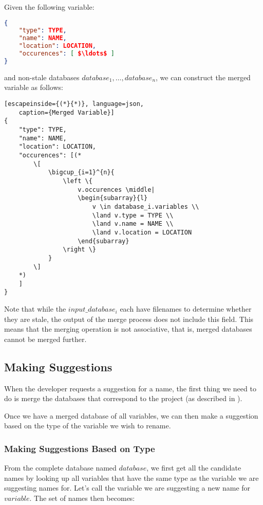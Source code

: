 Given the following variable:
\begin{lstlisting}[mathescape, language=json, caption={Example Variable}]
{
	"type": TYPE,
	"name": NAME,
	"location": LOCATION,
	"occurences": [ $\ldots$ ]
}
\end{lstlisting}
and non-stale databases $database_1, \ldots, database_n$, we can construct the
merged variable as follows:

\begin{lstlisting}[escapeinside={(*}{*)}, language=json,
	caption={Merged Variable}]
{
	"type": TYPE,
	"name": NAME,
	"location": LOCATION,
	"occurences": [(*
		\[
			\bigcup_{i=1}^{n}{
				\left \{
					v.occurences \middle|
					\begin{subarray}{l}
						v \in database_i.variables \\
						\land v.type = TYPE \\
						\land v.name = NAME \\
						\land v.location = LOCATION
					\end{subarray}
				\right \}
			}
		\]
	*)
	]
}
\end{lstlisting}
Note that while the $input\_database_i$ each have filenames to determine
whether they are stale, the output of the merge process does not include this
field. This means that the merging operation is not associative, that is, merged
databases cannot be merged further.

\subsection{Making Suggestions}
\label{sec:suggesting}

When the developer requests a suggestion for a name, the first thing we need to
do is merge the databases that correspond to the project (as described in
).

Once we have a merged database of all variables, we can then make a suggestion
based on the type of the variable we wish to rename.

\subsubsection{Making Suggestions Based on Type}

From the complete database named $database$, we first get all the candidate
names by looking up all variables that have the same type as the variable we are
suggesting names for. Let's call the variable we are suggesting a new name for
$variable$. The set of names then becomes:

